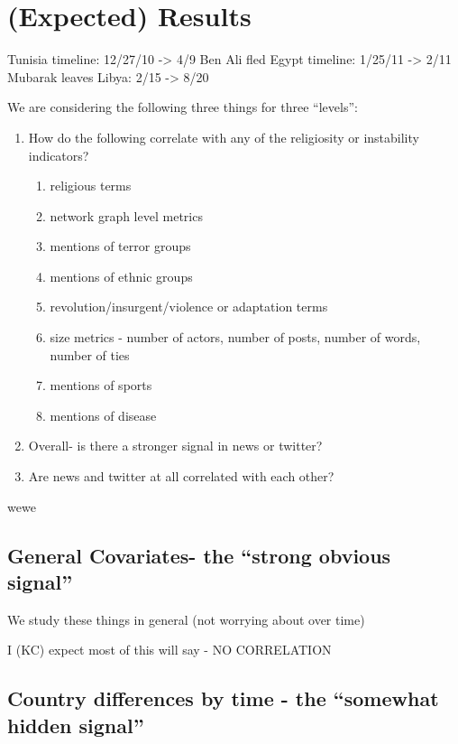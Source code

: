 
\section{(Expected) Results}

  Tunisia timeline: 12/27/10 -> 4/9 Ben Ali fled
    Egypt timeline: 1/25/11 -> 2/11 Mubarak leaves
    Libya: 2/15 -> 8/20


We are considering the following three things for three ``levels'':

\begin{enumerate}

\item How do the following correlate with any of the religiosity or instability indicators?
    \begin{enumerate}
        \item religious terms
        \item network graph level metrics
        \item mentions of terror groups
        \item mentions of ethnic groups
        \item revolution/insurgent/violence or adaptation terms
        \item size metrics - number of actors, number of posts,
        number of words, number of ties
        \item mentions of sports
        \item mentions of disease
    \end{enumerate}

\item Overall- is there a stronger signal in news or twitter?  

\item Are news and twitter at all correlated with each other?


\end{enumerate}

wewe
\subsection{General Covariates- the ``strong obvious signal''}

We study these things in general (not worrying about over time) 

I (KC) expect most of this will say - NO CORRELATION


\subsection{Country differences by time - the ``somewhat hidden signal''}

